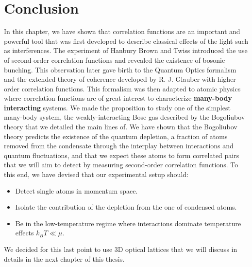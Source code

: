 \section{Conclusion}

In this chapter, we have shown that correlation functions are an important and powerful tool that was first developed to describe classical effects of the light such as interferences. The experiment of Hanbury Brown and Twiss introduced the use of second-order correlation functions and revealed the existence of bosonic bunching. This observation later gave birth to the Quantum Optics formalism and the extended theory of coherence developed by R. J. Glauber with higher order correlation functions. This formalism was then adapted to atomic physics where correlation functions are of great interest to characterize \textbf{many-body interacting} systems. We made the proposition to study one of the simplest many-body system, the weakly-interacting Bose gas described by the Bogoliubov theory that we detailed the main lines of. We have shown that the Bogoliubov theory predicts the existence of the quantum depletion, a fraction of atoms removed from the condensate through the interplay between interactions and quantum fluctuations, and that we expect these atoms to form \kmk correlated pairs that we will aim to detect by measuring second-order correlation functions. To this end, we have devised that our experimental setup should:

\begin{itemize}
    \item Detect single atoms in momentum space.
    \item Isolate the contribution of the depletion from the one of condensed atoms.
    \item Be in the low-temperature regime where interactions dominate temperature effects $k_B T \ll \mu $. 
\end{itemize}

We decided for this last point to use 3D optical lattices that we will discuss in details in the next chapter of this thesis.
